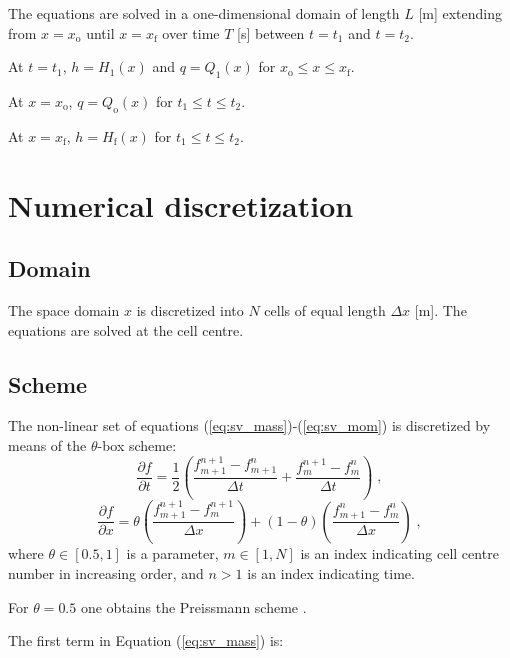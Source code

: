 \documentclass{deltares_report_elv}
\newcommand{\mathsub}[2]{#1_{\mathrm{#2}}}
\begin{document}
The equations are solved in a one-dimensional domain of length $L$ [\si{m}] extending from $x=\mathsub{x}{o}$ until $x=\mathsub{x}{f}$ over time $T$ [\si{s}] between $t=\mathsub{t}{1}$ and $t=\mathsub{t}{2}$.

At $t=\mathsub{t}{1}$, $h=\mathsub{H}{1}(x)$ and $q=\mathsub{Q}{1}(x)$ for $\mathsub{x}{o}\leq x \leq\mathsub{x}{f}$.

At $x=\mathsub{x}{o}$, $q=\mathsub{Q}{o}(x)$ for $\mathsub{t}{1}\leq t \leq\mathsub{t}{2}$.

At $x=\mathsub{x}{f}$, $h=\mathsub{H}{f}(x)$ for $\mathsub{t}{1}\leq t \leq\mathsub{t}{2}$.

\section{Numerical discretization}

\subsection{Domain}

The space domain $x$ is discretized into $N$ cells of equal length $\Delta x$ [\si{m}]. The equations are solved at the cell centre. 

\subsection{Scheme}

The non-linear set of equations (\ref{eq:sv_mass})-(\ref{eq:sv_mom}) is discretized by means of the $\theta$-box scheme:
\begin{equation}
\frac{\partial f}{\partial t}=\frac{1}{2}\left(\frac{f_{m+1}^{n+1}-f_{m+1}^{n}}{\Delta t}+\frac{f_{m}^{n+1}-f_{m}^{n}}{\Delta t}\right) \;,
\end{equation}
\begin{equation}
\frac{\partial f}{\partial x}=\theta\left(\frac{f_{m+1}^{n+1}-f_{m}^{n+1}}{\Delta x}\right)+\left(1-\theta\right)\left(\frac{f_{m+1}^{n}-f_{m}^{n}}{\Delta x}\right) \;,
\end{equation}
where $\theta\in[0.5,1]$ is a parameter, $m\in[1,N]$ is an index indicating cell centre number in increasing order, and $n>1$ is an index indicating time. 

For $\theta=0.5$ one obtains the Preissmann scheme \citep{Preissmann61_2,Preissmann61_3,Lyn87_2}.

The first term in Equation (\ref{eq:sv_mass}) is:
\begin{equation}

\end{equation}
\end{document}
